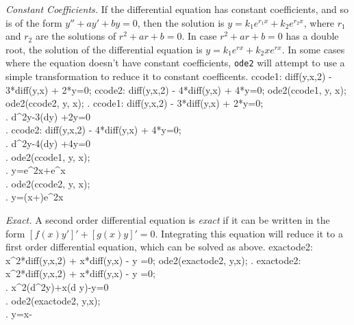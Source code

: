 \documentclass{article}
\begin{document}
\noindent
\textit{Constant Coefficients.}\quad
If the differential equation has constant coefficients, and so is of
the form $y'' + ay' + by=0$, then the solution is 
$y=k_1 e^{r_1x} + k_2 e^{r_2x}$, where $r_1$ and $r_2$ are the
solutions of $r^2 + ar + b=0$. In case $r^2 + ar + b=0$ has a double
root, the solution of the differential equation is $y=k_1e^{rx} + k_2
xe^{rx}$. In some cases where the equation doesn't have constant
coefficients, \texttt{ode2} will attempt to use a simple
transformation to reduce it to constant coefficents.
\beginmaximasession
ccode1: diff(y,x,2) - 3*diff(y,x) + 2*y=0;
ccode2: diff(y,x,2) - 4*diff(y,x) + 4*y=0;
ode2(ccode1, y, x);
ode2(ccode2, y, x);
\maximatexsession
{}.  ccode1: diff(y,x,2) - 3*diff(y,x) + 2*y=0; \\
.   {{d^{2}}}\*y-3\*\left({{d}}\*y\right)
 +2\*y=0 \\
.  ccode2: diff(y,x,2) - 4*diff(y,x) + 4*y=0; \\
.   {{d^{2}}}\*y-4\*\left({{d}}\*y\right)
 +4\*y=0 \\
.  ode2(ccode1, y, x); \\
.   y=\*e^{2\*x}+\*e^{x} \\
.  ode2(ccode2, y, x); \\
.   y=\left(\*x+\right)\*e^{2\*x} \\
\endmaximasession

\smallskip

\noindent
\textit{Exact.}\quad
A second order differential equation is \textit{exact} if it can be written in
the form $[f(x)y']' + [g(x)y]' = 0$.  Integrating this equation will
reduce it to a first order differential equation, which can be solved
as above.
\beginmaximasession
exactode2: x^2*diff(y,x,2) + x*diff(y,x) - y =0;
ode2(exactode2, y,x);
\maximatexsession
{}.  exactode2: x^2*diff(y,x,2) + x*diff(y,x) - y =0; \\
.   x^{2}\*\left({{d^{2}}}\*y\right)+x\*\left({{d
 }}\*y\right)-y=0 \\
.  ode2(exactode2, y,x); \\
.   y=\*x-{{}} \\
\endmaximasession

\smallskip
\end{document}
